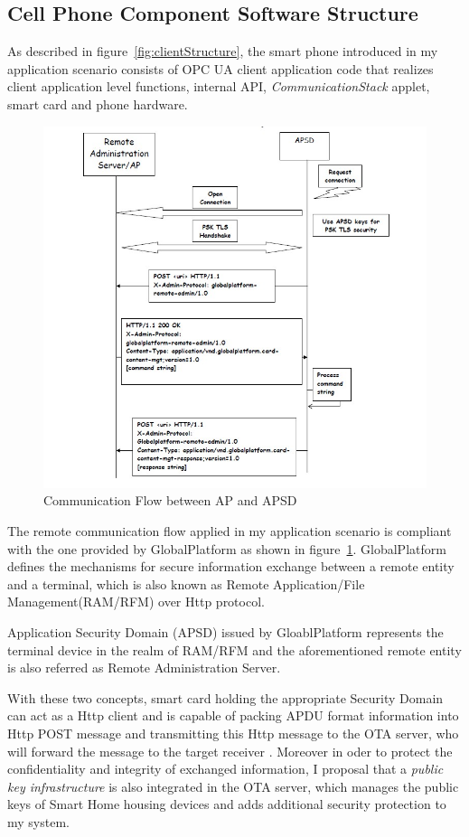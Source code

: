 \subsection{Cell Phone Component Software Structure}
As described in figure~\ref{fig:clientStructure}, the smart phone introduced in my application scenario consists of OPC UA client application code that realizes client application level functions, internal API, \emph{CommunicationStack} applet, smart card and phone hardware.

\begin{figure}[!htb]
	\centering
	\includegraphics[width=1\textwidth]{apsd.jpg}
		\caption{Communication Flow between AP and APSD \cite{ramGP}}
	\label{fig:apsd}
\end{figure}
The remote communication flow applied in my application scenario is compliant with the one provided by GlobalPlatform as shown in figure~\ref{fig:apsd}. GlobalPlatform defines the mechanisms for secure information exchange between a remote entity and a terminal, which is also known as Remote Application/File Management(RAM/RFM) over Http protocol. 

Application Security Domain (APSD) issued by GloablPlatform represents the terminal device in the realm of RAM/RFM and the aforementioned remote entity  is also referred as Remote Administration Server. 

With these two concepts, smart card holding the appropriate Security Domain can act as a Http client and is capable of packing APDU format information into Http POST message and transmitting this Http message to the OTA server, who will forward the message to the target receiver \cite{ramGP}. Moreover in oder to protect the confidentiality and integrity of exchanged information, I proposal that a \emph{public key infrastructure} is also integrated in the OTA server, which manages the public keys of Smart Home housing devices and adds additional security protection to my system.
 
